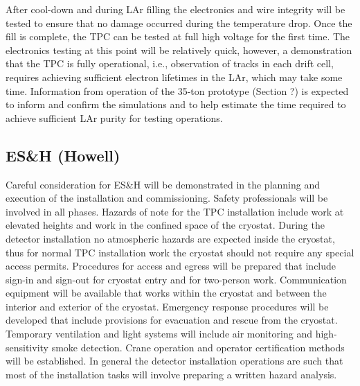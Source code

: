 After cool-down and during LAr filling the electronics and wire integrity will be tested to ensure that no damage occurred during the temperature drop. Once the fill is complete, the TPC can be tested at full high voltage for the 
first time. The electronics testing at this point will be relatively quick, however, a demonstration that the TPC is fully operational, i.e., observation of tracks in each drift cell, requires achieving sufficient electron lifetimes in the 
LAr, which may take some time. Information from operation of the 35-ton prototype (Section ?) is expected to inform and confirm the simulations and to help estimate the time required to achieve sufficient LAr purity for testing operations. 


\subsection{ES\&H (Howell)}
\label{fd:install:esh}

Careful consideration for ES\&H will be demonstrated in the planning and execution of the installation and commissioning. Safety professionals will be involved in all phases. Hazards of note for the TPC installation 
include work at elevated heights and work in the confined space of the cryostat. During the detector installation no atmospheric hazards are expected inside the cryostat, thus for normal TPC installation work the cryostat 
should not require any special access permits. Procedures for access and egress will be prepared that include sign-in and sign-out for cryostat entry and for two-person work. Communication equipment will be available that 
works within the cryostat and between the interior and exterior of the cryostat. Emergency response procedures will be developed that include provisions for evacuation and rescue from the cryostat. Temporary ventilation and 
light systems will include air monitoring and high-sensitivity smoke detection. Crane operation and operator certification methods will be established. In general the detector installation operations are such that most of the installation tasks will involve preparing a written hazard analysis. 
